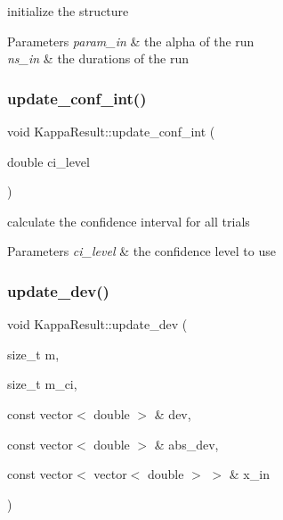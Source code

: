 initialize the structure 


\begin{DoxyParams}{Parameters}
{\em param\+\_\+in} & the alpha of the run \\
\hline
{\em ns\+\_\+in} & the durations of the run \\
\hline
\end{DoxyParams}
\mbox{\label{structKappaResult_a8dd8b127d34165637298435377489cff}} 
\subsubsection{\texorpdfstring{update\+\_\+conf\+\_\+int()}{update\_conf\_int()}}
{\footnotesize\ttfamily void Kappa\+Result\+::update\+\_\+conf\+\_\+int (\begin{DoxyParamCaption}\item[{double}]{ci\+\_\+level }\end{DoxyParamCaption})\hspace{0.3cm}{\ttfamily [inline]}}



calculate the confidence interval for all trials 


\begin{DoxyParams}{Parameters}
{\em ci\+\_\+level} & the confidence level to use \\
\hline
\end{DoxyParams}
\mbox{\label{structKappaResult_ad9a40b7ecb6f56e1e868fd559e07026f}} 
\subsubsection{\texorpdfstring{update\+\_\+dev()}{update\_dev()}}
{\footnotesize\ttfamily void Kappa\+Result\+::update\+\_\+dev (\begin{DoxyParamCaption}\item[{size\+\_\+t}]{m,  }\item[{size\+\_\+t}]{m\+\_\+ci,  }\item[{const vector$<$ double $>$ \&}]{dev,  }\item[{const vector$<$ double $>$ \&}]{abs\+\_\+dev,  }\item[{const vector$<$ vector$<$ double $>$ $>$ \&}]{x\+\_\+in }\end{DoxyParamCaption})\hspace{0.3cm}{\ttfamily [inline]}}



